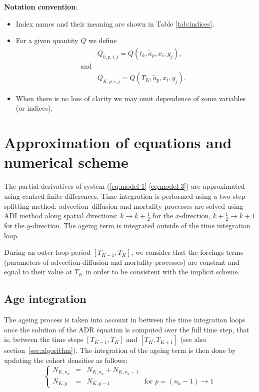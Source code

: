 \noindent
\textbf{Notation convention}:
\\
\begin{itemize}
    \item Index names and their meaning are shown in Table \ref{tab:indices}.
    \item For a given quantity $Q$ we define
    \begin{align}
      \label{eq:quantity-grid-tk}
      & Q_{k,p,i,j} = Q(t_k, \widetilde{a}_p, x_i,y_j),&
      \\\nonumber \mbox{and}\\
      \label{eq:quantity-grid-Tk}
      & Q_{K,p,i,j} = Q(T_K, \widetilde{a}_p, x_i,y_j).&
    \end{align}
    \item When there is no loss of clarity we may omit dependence of some variables (or indices). 
\end{itemize}

\section{Approximation of equations and numerical scheme}
\label{sec:equation-discrete-and-numerical-scheme}

The partial derivatives of system (\ref{eq:model-1}-\ref{eq:model-3}) are approximated using centred finite differences. Time integration is performed using a two-step splitting method: advection--diffusion and mortality processes are solved using ADI method along spatial directions: $k\to k+\frac{1}{2}$ for the $x$-direction, $k+\frac{1}{2}\to k+1$ for the $y$-direction. The ageing term is integrated outside of the time integration loop.

During an outer loop period $[T_{K-1},T_{K}]$, we consider that the forcings terms (parameters of advection-diffusion and mortality processes) are constant and equal to their value at $T_{K}$ in order to be consistent with the implicit scheme.

\subsection{Age integration} 
\label{sec:age-integration}

The ageing process is taken into account in between the time integration loops once the solution of the ADR equation is computed over the full time step, that is, between the time steps $[T_{K-1},T_K]$ and $[T_K,T_{K+1}]$ (see also section~\ref{sec:algorithm}). The integration of the ageing term is then done by updating the cohort densities as follows:
\begin{equation}
  \label{eq:aging}
  \left\lbrace
  \begin{array}{lcll}
    N_{K,n_a} &=& N_{K,n_a}+N_{K,n_a-1}&\\
    N_{K,p} &=& N_{K,p-1} &\text{for $p=(n_a-1)\to 1$}
  
  \end{array}
  \right.
\end{equation}


